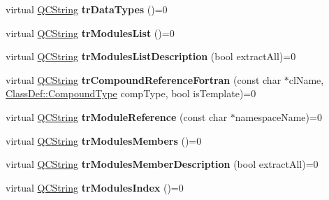 \begin{DoxyCompactItemize}
\item 
\hypertarget{class_translator_a5b9af29e36bff8c1dfb4ddb10f449b30}{virtual \hyperlink{class_q_c_string}{Q\-C\-String} {\bfseries tr\-Data\-Types} ()=0}\label{class_translator_a5b9af29e36bff8c1dfb4ddb10f449b30}

\item 
\hypertarget{class_translator_a4d2d61f85a7e12dc9178f9ef73aba2cb}{virtual \hyperlink{class_q_c_string}{Q\-C\-String} {\bfseries tr\-Modules\-List} ()=0}\label{class_translator_a4d2d61f85a7e12dc9178f9ef73aba2cb}

\item 
\hypertarget{class_translator_a7be452fd7fe43a6bb3b78cc1051102fd}{virtual \hyperlink{class_q_c_string}{Q\-C\-String} {\bfseries tr\-Modules\-List\-Description} (bool extract\-All)=0}\label{class_translator_a7be452fd7fe43a6bb3b78cc1051102fd}

\item 
\hypertarget{class_translator_ad37569014492f7d2d36d1ff0cabfc047}{virtual \hyperlink{class_q_c_string}{Q\-C\-String} {\bfseries tr\-Compound\-Reference\-Fortran} (const char $\ast$cl\-Name, \hyperlink{class_class_def_a768a6f0a6fd7e9087ff7971abbcc3f36}{Class\-Def\-::\-Compound\-Type} comp\-Type, bool is\-Template)=0}\label{class_translator_ad37569014492f7d2d36d1ff0cabfc047}

\item 
\hypertarget{class_translator_ad4089349e51d9d85da34a0c67deacc62}{virtual \hyperlink{class_q_c_string}{Q\-C\-String} {\bfseries tr\-Module\-Reference} (const char $\ast$namespace\-Name)=0}\label{class_translator_ad4089349e51d9d85da34a0c67deacc62}

\item 
\hypertarget{class_translator_a3939d2dadd755a2dbb915b616649c537}{virtual \hyperlink{class_q_c_string}{Q\-C\-String} {\bfseries tr\-Modules\-Members} ()=0}\label{class_translator_a3939d2dadd755a2dbb915b616649c537}

\item 
\hypertarget{class_translator_a069d5062bac4bf9afe30fb8d6279526c}{virtual \hyperlink{class_q_c_string}{Q\-C\-String} {\bfseries tr\-Modules\-Member\-Description} (bool extract\-All)=0}\label{class_translator_a069d5062bac4bf9afe30fb8d6279526c}

\item 
\hypertarget{class_translator_a9fb9bbd0d2979417404a0cc45312a4a8}{virtual \hyperlink{class_q_c_string}{Q\-C\-String} {\bfseries tr\-Modules\-Index} ()=0}\label{class_translator_a9fb9bbd0d2979417404a0cc45312a4a8}


\end{DoxyCompactItemize}
